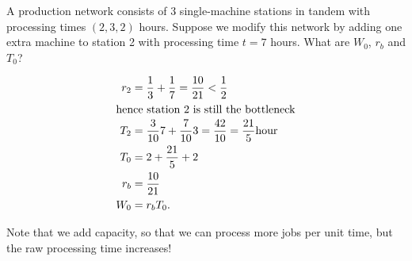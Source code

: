 \begin{question}
  A production network consists of 3 single-machine stations in tandem
  with processing times $(2, 3, 2)$ hours.  Suppose we modify this
  network by adding one extra machine to station 2 with processing
  time $t=7$ hours.  What are $W_0$, $r_b$ and $T_0$?
\end{question}
\begin{solution}
  \begin{align*}
  r_2 &= \frac13 + \frac17 = \frac{10}{21} < \frac12\\
\intertext{hence station 2 is still the bottleneck}
T_2 &= \frac{3}{10}7 + \frac{7}{10}3 = \frac{42}{10}=\frac{21}{5}\text{hour}\\
T_0&=2+\frac{21}{5} +2\\
r_b &= \frac{10}{21}\\
W_0 &= r_b T_0.
   \end{align*}

   Note that we add capacity, so that we can process more jobs per
   unit time, but the raw processing time increases!
\end{solution}


